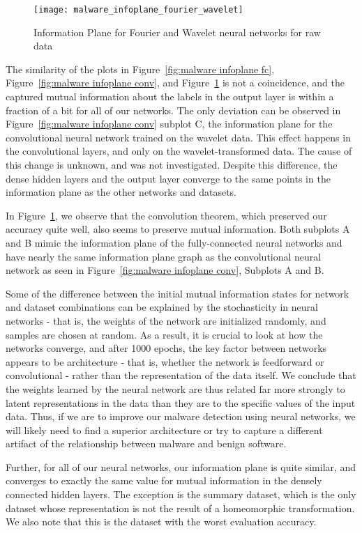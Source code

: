 \begin{figure}[h!]
\begin{center}
\texttt{[image: malware\_infoplane\_fourier\_wavelet]}
\caption{Information Plane for Fourier and Wavelet neural networks for raw data}
\label{fig:malware infoplane fourier-wavelet}
\centering
\end{center}
\end{figure}


The similarity of the plots in Figure~\ref{fig:malware infoplane fc}, Figure~\ref{fig:malware infoplane conv}, and Figure~\ref{fig:malware infoplane fourier-wavelet} is not a coincidence, and the captured mutual information about the labels in the output layer is within a fraction of a bit for all of our networks. 
The only deviation can be observed in Figure~\ref{fig:malware infoplane conv} subplot C, the information plane for the convolutional neural network trained on the wavelet data. 
This effect happens in the convolutional layers, and only on the wavelet-transformed data.
The cause of this change is unknown, and was not investigated.
Despite this difference, the dense hidden layers and the output layer converge to the same points in the information plane as the other networks and datasets.

In Figure~\ref{fig:malware infoplane fourier-wavelet}, we observe that the convolution theorem, which preserved our accuracy quite well, also seems to preserve mutual information.
Both subplots A and B mimic the information plane of the fully-connected neural networks and have nearly the same information plane graph as the convolutional neural network as seen in Figure~\ref{fig:malware infoplane conv}, Subplots A and B.

Some of the difference between the initial mutual information states for network and dataset combinations can be explained by the stochasticity in neural networks - that is, the weights of the network are initialized randomly, and samples are chosen at random. 
As a result, it is crucial to look at how the networks converge, and after 1000 epochs, the key factor between networks appears to be architecture - that is, whether the network is feedforward or convolutional - rather than the representation of the data itself.
We conclude that the weights learned by the neural network are thus related far more strongly to latent representations in the data than they are to the specific values of the input data.
Thus, if we are to improve our malware detection using neural networks, we will likely need to find a superior architecture or try to capture a different artifact of the relationship between malware and benign software.

Further, for all of our neural networks, our information plane is quite similar, and converges to exactly the same value for mutual information in the densely connected hidden layers.
The exception is the summary dataset, which is the only dataset whose representation is not the result of a homeomorphic transformation.
We also note that this is the dataset with the worst evaluation accuracy.